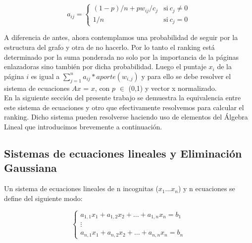     \begin{equation}
        a_{ij} = \left\{
                \begin{array}{ll}
                     (1-p)/n + p w_{ij}/c_{j} & \mathrm{si\ } c_j \neq 0 \\
                     1/n    & \mathrm{si\ } c_j = 0
                \end{array}
            \right.
    \end{equation} 

A diferencia de antes, ahora contemplamos una probabilidad de seguir por la estructura del grafo y otra de no hacerlo. Por lo tanto el ranking está determinado por la suma ponderada no solo por la importancia de la páginas enlazadoras sino también por dicha probabilidad. Luego el puntaje $x_{i}$ de la página $i$ es igual a $\sum_{j=1}^{n} a_{ij} * aporte (w_{i,j})$ y para ello se debe resolver el sistema de ecuaciones $Ax$ = $x$, con $p$ $\in$ (0,1) y vector x normalizado.\\

En la siguiente sección del presente trabajo se demuestra la equivalencia entre este sistema de ecuaciones y otro que efectivamente resolvemos para calcular el ranking. Dicho sistema pueden resolverse haciendo uso de elementos del Álgebra Lineal que introducimos brevemente a continuación. \\

\subsection{Sistemas de ecuaciones lineales y Eliminación Gaussiana}

Un sistema de ecuaciones lineales de n incognitas ($x_{1} \dots x_{n}$) y n ecuaciones se define del siguiente modo:

    \begin{equation*}
     	\left\{
                \begin{array}{l}
                
                     a_{1,1}x_{1} + a_{1,2}x_{2} + \dots + a_{1,n}x_{n} =  b_{1} \\
                     \vdots \\ 
                    a_{n,1}x_{1} + a_{n,2}x_{2} + \dots + a_{n,n}x_{n} =  b_{n} 
                    
                \end{array}
       \right.
    \end{equation*}  
    
